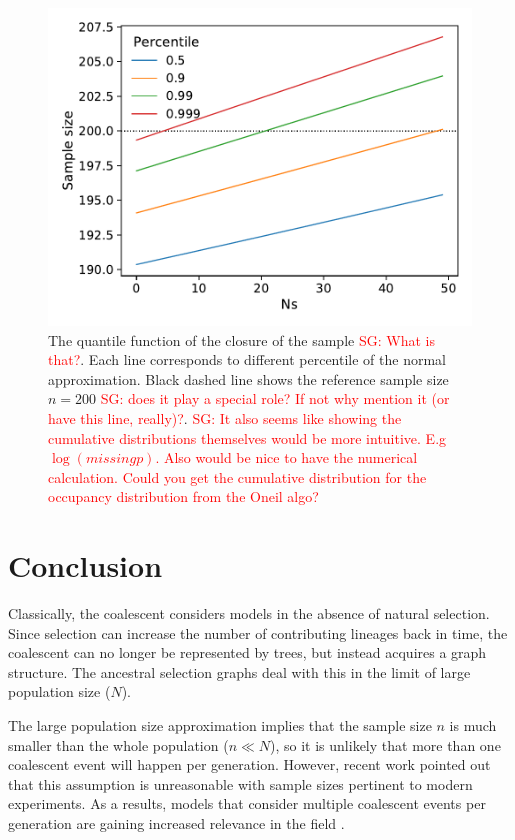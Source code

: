 \documentclass[review]{elsarticle}
\newcommand{\sgcomment}[1]{\textcolor{red}{SG: #1}}
\begin{document}
\begin{figure}
  \centering
  \includegraphics[]{fig/quantile.pdf}
  \caption{The quantile function of the closure of the sample \sgcomment{What is that?}. Each line
    corresponds to different percentile of the normal approximation. Black dashed line shows the
    reference sample size $n=200$ \sgcomment{does it play a special role? If not why mention it (or
      have this line, really)?}. \sgcomment{It also seems like showing the cumulative distributions
      themselves would be more intuitive. E.g $\log(missing p)$. Also would be nice to have the
      numerical calculation. Could you get the cumulative distribution for the occupancy
      distribution from the Oneil algo? }}
  \label{fig:normal-approximation}
\end{figure}


\section{Conclusion}
\label{sec:conclusion}

Classically, the coalescent considers models in the absence of natural selection. Since selection
can increase the number of contributing lineages back in time, the coalescent can no longer be
represented by trees, but instead acquires a graph structure. The ancestral selection graphs
\citep{KroneNeuhauser1997} deal with this in the limit of large population size ($N$).

The large population size approximation implies that the sample size $n$ is much smaller than the
whole population ($n \ll N$), so it is unlikely that more than one coalescent event will happen per
generation. However, recent work \citep{BhaskarEtAl2014,NelsonEtAl2019} pointed out that this
assumption is unreasonable with sample sizes pertinent to modern experiments. As a results, models
that consider multiple coalescent events per generation are gaining increased relevance in the
field \citep{FlemmingtonVoitCoalescentPapers}.
\end{document}
